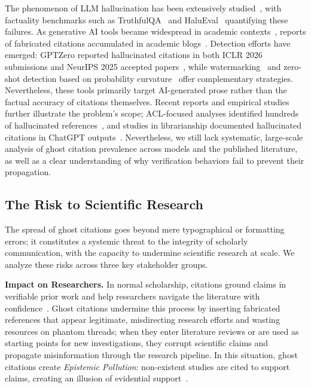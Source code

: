 The phenomenon of LLM hallucination has been extensively studied~\cite{ji2023survey,zhang2025siren,huang2023survey}, with factuality benchmarks such as TruthfulQA~\cite{lin2022truthfulqa} and HaluEval~\cite{li2023halueval} quantifying these failures.
As generative AI tools became widespread in academic contexts~\cite{lund2023chatgpt,cotton2024chatting,dwivedi2023so}, reports of fabricated citations accumulated in academic blogs~\cite{consultmu2026ghost,tay2025why}.
Detection efforts have emerged: GPTZero reported hallucinated citations in both ICLR 2026 submissions and NeurIPS 2025 accepted papers~\cite{gptzero2026iclr,gptzero2025nips}, while watermarking~\cite{kirchenbauer2023watermark} and zero-shot detection based on probability curvature~\cite{mitchell2023detectgpt} offer complementary strategies.
Nevertheless, these tools primarily target AI-generated prose rather than the factual accuracy of citations themselves. Recent reports and empirical studies further illustrate the problem's scope; ACL-focused analyses identified hundreds of hallucinated references~\cite{sakai2026hallucitation}, and studies in librarianship documented hallucinated citations in ChatGPT outputs~\cite{oladokun2025hallucitation}.
Nevertheless, we still lack systematic, large-scale analysis of ghost citation prevalence across models and the published literature, as well as a clear understanding of why verification
behaviors fail to prevent their propagation.

\subsection{The Risk to Scientific Research}
\label{sec:background:record}

The spread of ghost citations goes beyond mere typographical or formatting errors; it constitutes a systemic threat to the integrity of scholarly communication, with the capacity to undermine scientific research at scale. We analyze these risks across three key stakeholder groups.

\noindent
\textbf{Impact on Researchers.}
In normal scholarship, citations ground claims in verifiable prior work and help researchers navigate the literature with confidence~\cite{kaplan1965norms,merton1973sociology}.
Ghost citations undermine this process by inserting fabricated references that appear legitimate, misdirecting research efforts and wasting resources on phantom threads; when they enter literature reviews or are used as starting points for new investigations, they corrupt scientific claims and propagate misinformation through the research pipeline.
In this situation, ghost citations create \textit{Epistemic Pollution}: non-existent studies are cited to support claims, creating an illusion of evidential support~\cite{greenberg2009how}.


